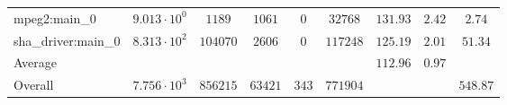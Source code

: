 \begin{tabular}{|l|c|c|c|c|c|c|c|c|}
mpeg2:main\_0           & $ 9.013 \cdot 10^{0} $ & $ 1189   $ & $ 1061  $ & $ 0   $ & $ 32768  $ & $ 131.93      $ & $ 2.42    $ & $ 2.74    $ \\
sha\_driver:main\_0     & $ 8.313 \cdot 10^{2} $ & $ 104070 $ & $ 2606  $ & $ 0   $ & $ 117248 $ & $ 125.19      $ & $ 2.01    $ & $ 51.34   $ \\
\hline
Average                 & $                    $ & $        $ & $       $ & $     $ & $        $ & $ 112.96      $ & $ 0.97    $ & $         $ \\
\hline
Overall                 & $ 7.756 \cdot 10^{3} $ & $ 856215 $ & $ 63421 $ & $ 343 $ & $ 771904 $ & $             $ & $         $ & $ 548.87  $ \\
\hline
\end{tabular}
